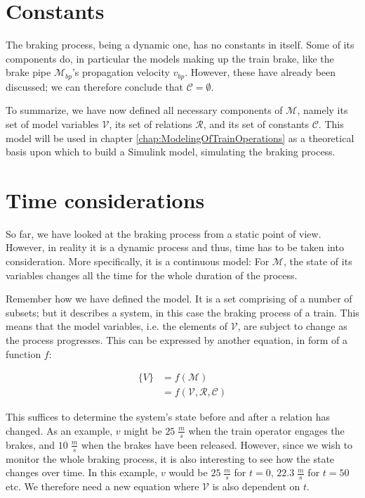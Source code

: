\section{Constants}
\label{sec:Constants}
\par\noindent
The braking process, being a dynamic one, has no constants in itself. Some of its components do, in particular the models making up the train brake, like the brake pipe ${\mathcal{M}}_{bp}$'s propagation velocity $v_{bp}$. However, these have already been discussed; we can therefore conclude that ${\mathcal{C}} = \emptyset$.
\bigskip
\par\noindent
To summarize, we have now defined all necessary components of ${\mathcal{M}}$, namely its set of model variables ${\mathcal{V}}$, its set of relations ${\mathcal{R}}$, and its set of constants ${\mathcal{C}}$. This model will be used in chapter \ref{chap:ModelingOfTrainOperations} as a theoretical basis upon which to build a Simulink model, simulating the braking process.

\section{Time considerations}
\label{sec:TimeConsiderations}
\par\noindent
So far, we have looked at the braking process from a static point of view. However, in reality it is a dynamic process and thus, time has to be taken into consideration. More specifically, it is a continuous model: For ${\mathcal{M}}$, the state of its variables changes all the time for the whole duration of the process. 
\par
Remember how we have defined the model. It is a set comprising of a number of subsets; but it describes a system, in this case the braking process of a train. This means that the model variables, i.e. the elements of ${\mathcal{V}}$, are subject to change as the process progresses. This can be expressed by another equation, in form of a function $f$:

\begin{align*}
\{ V \} &= f( {\mathcal{M}} ) \\
		&= f( {\mathcal{V}}, {\mathcal{R}}, {\mathcal{C}} )
\end{align*}

\noindent
This suffices to determine the system's state before and after a relation has changed. As an example, $v$ might be $25 \; \frac{m}{s}$ when the train operator engages the brakes, and $10 \; \frac{m}{s}$ when the brakes have been released. However, since we wish to monitor the whole braking process, it is also interesting to see how the state changes over time. In this example, $v$ would be $25 \; \frac{m}{s}$ for $t=0$, $22.3 \; \frac{m}{s}$ for $t=50$ etc. We therefore need a new equation where ${\mathcal{V}}$ is also dependent on $t$.

